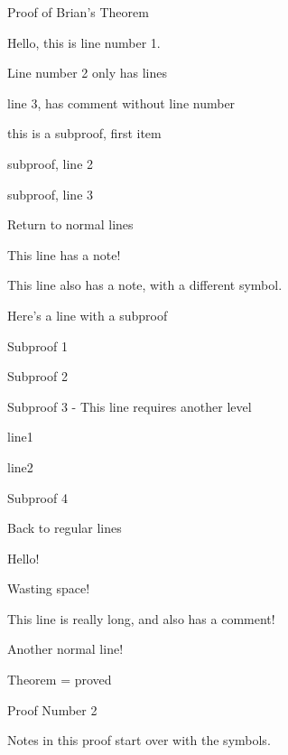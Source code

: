 \documentclass{homework}
\begin{document}
\maketitle

\begin{numproof}{Proof of Brian's Theorem}
	\item Hello, this is line number 1.
	\item Line number 2 only has lines 
	\item line 3, has comment without line number 
	\begin{subproof}{1}
		\item this is a subproof, first item
		\item subproof, line 2 
		\item subproof, line 3 
	\end{subproof}
	\item Return to normal lines
	\item This line has a note! 
	\item This line also has a note, with a different symbol. 
	\item Here's a line with a subproof
		\begin{subproof}{1}
			\item Subproof 1
			\item Subproof 2
			\item Subproof 3 - This line requires another level
				\begin{subproof}{2}
					\item line1
					\item line2
				\end{subproof}
			\item Subproof 4
		\end{subproof}
	\item Back to regular lines
	\item Hello!
	\item Wasting space!
	\item This line is really long, and also has a comment! \lipsum[4] 
	\item Another normal line!
	\item Theorem = proved
\end{numproof}


\newpage
\begin{numproof}{Proof Number 2}
	\item Notes in this proof start over with the symbols. 
\end{numproof}
\end{document}
